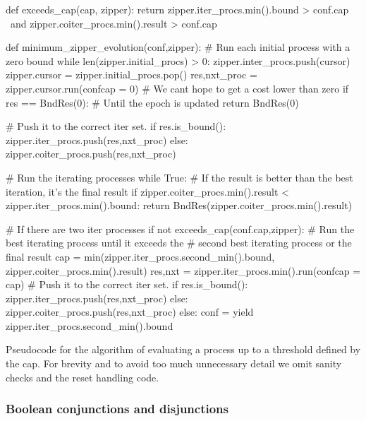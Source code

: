 \begin{code}
\begin{pycode}
def exceeds_cap(cap, zipper):
    return zipper.iter_procs.min().bound > conf.cap \
        and zipper.coiter_procs.min().result > conf.cap \


def minimum_zipper_evolution(conf,zipper):
    # Run each initial process with a zero bound
    while len(zipper.initial_procs) > 0:
        zipper.inter_procs.push(cursor)
        zipper.cursor = zipper.initial_procs.pop()
        res,nxt_proc = zipper.cursor.run(conf{cap = 0})
        # We cant hope to get a cost lower than zero
        if res == BndRes(0):
            # Until the epoch is updated
            return BndRes(0)

        # Push it to the correct iter set.
        if res.is_bound():
            zipper.iter_procs.push(res,nxt_proc)
        else:
            zipper.coiter_procs.push(res,nxt_proc)

    # Run the iterating processes
    while True:
        # If the result is better than the best iteration, it's the final result
        if zipper.coiter_procs.min().result < zipper.iter_procs.min().bound:
            return BndRes(zipper.coiter_procs.min().result)

        # If there are two iter processes
        if not exceeds_cap(conf.cap,zipper):
            # Run the best iterating process until it exceeds the
            # second best iterating process or the final result
            cap = min(zipper.iter_procs.second_min().bound,
                      zipper.coiter_procs.min().result)
            res,nxt =  zipper.iter_procs.min().run(conf{cap = cap})
            # Push it to the correct iter set.
            if res.is_bound():
                zipper.iter_procs.push(res,nxt_proc)
            else:
                zipper.coiter_procs.push(res,nxt_proc)
        else:
            conf = yield zipper.iter_procs.second_min().bound
\end{pycode}
  \caption{\label{lst:min_zipper_evolution}Pseudocode for the
    algorithm of evaluating a process up to a threshold defined by the
    cap. For brevity and to avoid too much unnecessary detail we omit
    sanity checks and the reset handling code.}
\end{code}

\subsubsection{Boolean conjunctions and disjunctions}

